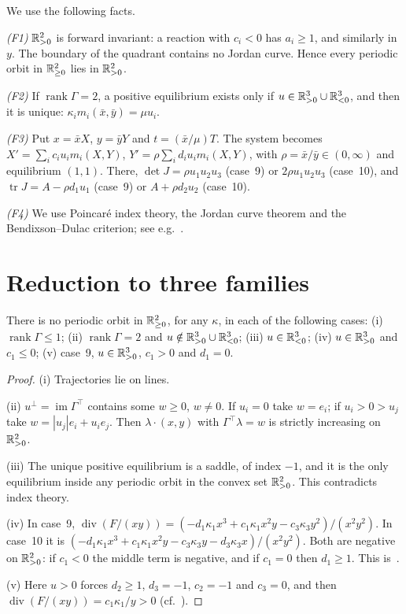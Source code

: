 \documentclass[11pt,a4paper]{report}
\newcommand{\Divop}{\operatorname{div}}
\newcommand{\Trop}{\operatorname{tr}}
\begin{document}
We use the following facts.

\emph{(F1)} \(\mathbb{R}^2_{>0}\) is forward invariant: a reaction with \(c_i<0\) has \(a_i\ge1\), and similarly in \(y\). The
boundary of the quadrant contains no Jordan curve. Hence every periodic orbit in \(\mathbb{R}^2_{\ge0}\) lies in
\(\mathbb{R}^2_{>0}\).

\emph{(F2)} If \(\operatorname{rank}\Gamma=2\), a positive equilibrium exists only if
\(u\in\mathbb{R}^3_{>0}\cup\mathbb{R}^3_{<0}\), and then it is unique: \(\kappa_im_i(\bar x,\bar y)=\mu u_i\).

\emph{(F3)} Put \(x=\bar xX\), \(y=\bar yY\) and \(t=(\bar x/\mu)T\). The system becomes
\(X'=\sum_ic_iu_im_i(X,Y)\), \(Y'=\rho\sum_id_iu_im_i(X,Y)\), with \(\rho=\bar x/\bar y\in(0,\infty)\) and
equilibrium \((1,1)\). There,
\(\det J=\rho u_1u_2u_3\) (case~9) or \(2\rho u_1u_2u_3\) (case~10), and
\(\Trop J=A-\rho d_1u_1\) (case~9) or \(A+\rho d_2u_2\) (case~10).

\emph{(F4)} We use Poincar\'e index theory, the Jordan curve theorem and the Bendixson--Dulac criterion; see
e.g.~\autocite[Ch.~3]{Perko2001}.

\section{Reduction to three families}

\begin{lemma}\label{lem:classes}
There is no periodic orbit in \(\mathbb{R}^2_{\ge0}\), for any \(\kappa\), in each of the following cases:
(i) \(\operatorname{rank}\Gamma\le1\);
(ii) \(\operatorname{rank}\Gamma=2\) and \(u\notin\mathbb{R}^3_{>0}\cup\mathbb{R}^3_{<0}\);
(iii) \(u\in\mathbb{R}^3_{<0}\);
(iv) \(u\in\mathbb{R}^3_{>0}\) and \(c_1\le0\);
(v) case~9, \(u\in\mathbb{R}^3_{>0}\), \(c_1>0\) and \(d_1=0\).
\end{lemma}

\begin{proof}
(i) Trajectories lie on lines.

(ii) \(u^\perp=\operatorname{im}\Gamma^\top\) contains some \(w\ge0\), \(w\neq0\). If \(u_i=0\) take
\(w=e_i\); if \(u_i>0>u_j\) take \(w=|u_j|e_i+u_ie_j\). Then \(\lambda\cdot(x,y)\) with \(\Gamma^\top\lambda=w\) is
strictly increasing on \(\mathbb{R}^2_{>0}\).

(iii) The unique positive equilibrium is a saddle, of index \(-1\), and it is the only equilibrium inside any
periodic orbit in the convex set \(\mathbb{R}^2_{>0}\). This contradicts index theory.

(iv) In case~9, \(\Divop(F/(xy))=(-d_1\kappa_1x^3+c_1\kappa_1x^2y-c_3\kappa_3y^2)/(x^2y^2)\). In case~10 it is
\((-d_1\kappa_1x^3+c_1\kappa_1x^2y-c_3\kappa_3y-d_3\kappa_3x)/(x^2y^2)\). Both are negative on \(\mathbb{R}^2_{>0}\): if
\(c_1<0\) the middle term is negative, and if \(c_1=0\) then \(d_1\ge1\). This is~\autocite[Lemma~4]{BBH2024}.

(v) Here \(u>0\) forces \(d_2\ge1\), \(d_3=-1\), \(c_2=-1\) and \(c_3=0\), and then \(\Divop(F/(xy))=c_1\kappa_1/y>0\)
(cf.~\autocite[§4.2]{BBH2024}).
\end{proof}
\end{document}
